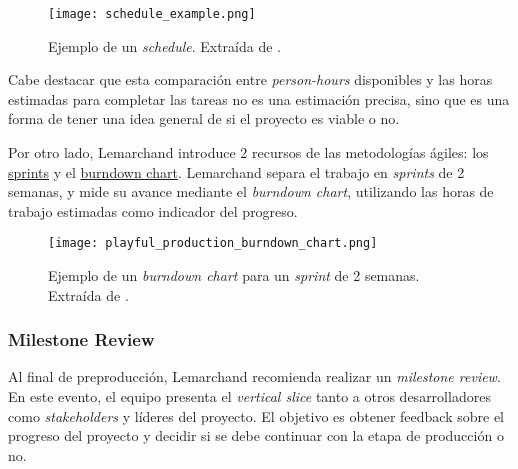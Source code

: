 %
\begin{figure}[H]
    \centering
    \texttt{[image: schedule\_example.png]}
    \caption{Ejemplo de un \textit{schedule}. Extraída de \cite{lemarchandPlayfulProductionProcess2021}.}
    \label{fig:x schedule ejemplo}
\end{figure}
%
\par Cabe destacar que esta comparación entre \textit{person-hours} disponibles y las horas estimadas para completar las tareas no es una estimación precisa, sino que es una forma de tener una idea general de si el proyecto es viable o no.
\bigbreak
\par Por otro lado, Lemarchand introduce 2 recursos de las metodologías ágiles: los \hyperref[sec:sprint]{sprints} y el \hyperref[sec:burndown_chart]{burndown chart}. Lemarchand separa el trabajo en \textit{sprints} de 2 semanas, y mide su avance mediante el \textit{burndown chart}, utilizando las horas de trabajo estimadas como indicador del progreso.
%
\begin{figure}[H]
    \centering
    \texttt{[image: playful\_production\_burndown\_chart.png]}
    \caption{Ejemplo de un \textit{burndown chart} para un \textit{sprint} de 2 semanas. Extraída de \cite{lemarchandPlayfulProductionProcess2021}.}
    \label{fig:x burndown chart Lemarchand}
\end{figure}
%
\subsubsection{Milestone Review}
\par Al final de preproducción, Lemarchand recomienda realizar un \textit{milestone review}. En este evento, el equipo presenta el \textit{vertical slice} tanto a otros desarrolladores como \textit{stakeholders} y líderes del proyecto. El objetivo es obtener feedback sobre el progreso del proyecto y decidir si se debe continuar con la etapa de producción o no.  %
%
%
%
